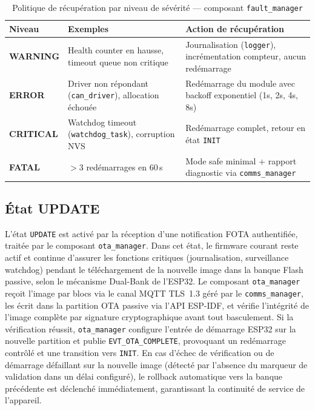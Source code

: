 \begin{table}[H]
\centering
\renewcommand{\arraystretch}{1.6}
\caption{Politique de récupération par niveau de sévérité — composant \texttt{fault\_manager}}
\label{tab:fault_policy}
\small
\begin{tabular}{|p{2.0cm}|p{3.5cm}|p{6.2cm}|}
\hline
\rowcolor{gray!20}
\textbf{Niveau} & \textbf{Exemples} & \textbf{Action de récupération} \\
\hline
\textbf{WARNING}  & Health counter en hausse, timeout queue non critique
                  & Journalisation (\texttt{logger}), incrémentation compteur, aucun redémarrage \\
\hline
\textbf{ERROR}    & Driver non répondant (\texttt{can\_driver}), allocation échouée
                  & Redémarrage du module avec backoff exponentiel (1s, 2s, 4s, 8s) \\
\hline
\textbf{CRITICAL} & Watchdog timeout (\texttt{watchdog\_task}), corruption NVS
                  & Redémarrage complet, retour en état \texttt{INIT} \\
\hline
\textbf{FATAL}    & $>$3 redémarrages en 60\,s
                  & Mode safe minimal + rapport diagnostic via \texttt{comms\_manager} \\
\hline
\end{tabular}
\end{table}

\subsection{État UPDATE}
\label{subsec:fsm_update}

L'état \texttt{UPDATE} est activé par la réception d'une notification
FOTA authentifiée, traitée par le composant \texttt{ota\_manager}.
Dans cet état, le firmware courant reste actif et continue d'assurer
les fonctions critiques (journalisation, surveillance watchdog) pendant
le téléchargement de la nouvelle image dans la banque Flash passive,
selon le mécanisme Dual-Bank de l'ESP32. Le composant
\texttt{ota\_manager} reçoit l'image par blocs via le canal MQTT
TLS~1.3 géré par le \texttt{comms\_manager}, les écrit dans la
partition OTA passive via l'API ESP-IDF, et vérifie l'intégrité de
l'image complète par signature cryptographique avant tout basculement.
Si la vérification réussit, \texttt{ota\_manager} configure l'entrée
de démarrage ESP32 sur la nouvelle partition et publie
\texttt{EVT\_OTA\_COMPLETE}, provoquant un redémarrage contrôlé et
une transition vers \texttt{INIT}. En cas d'échec de vérification ou
de démarrage défaillant sur la nouvelle image (détecté par l'absence
du marqueur de validation dans un délai configuré), le rollback
automatique vers la banque précédente est déclenché immédiatement,
garantissant la continuité de service de l'appareil.

